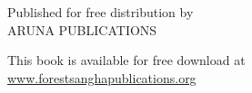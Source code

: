 
\mbox{}

\cleardoublepage

{\pagestyle{empty}\Large%

{\raggedleft\setlength{\parskip}{0.75em}\setlength{\parindent}{0em}

\vspace*{3\baselineskip}
{\fontGoudy\Large \thetitle}

\vfill

{\Small

Published for free distribution by\\
ARUNA PUBLICATIONS

This book is available for free download at\\
\href{http://www.forestsanghapublications.org/}{www.forestsanghapublications.org}

}

}}
